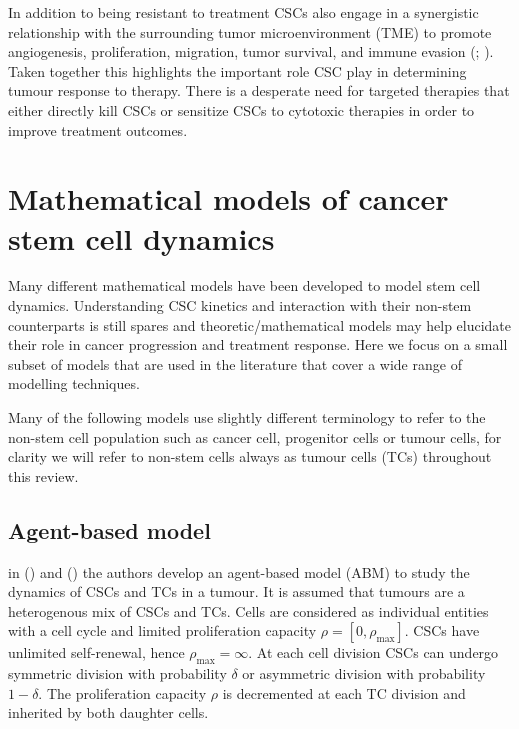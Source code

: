 \documentclass[
  letterpaper,
]{scrreprt}
\theoremstyle{definition}
\theoremstyle{remark}
\begin{document}
In addition to being resistant to treatment CSCs also engage in a
synergistic relationship with the surrounding tumor microenvironment
(TME) to promote angiogenesis, proliferation, migration, tumor survival,
and immune evasion (;
). Taken together this highlights the
important role CSC play in determining tumour response to therapy. There
is a desperate need for targeted therapies that either directly kill
CSCs or sensitize CSCs to cytotoxic therapies in order to improve
treatment outcomes.

\section{Mathematical models of cancer stem cell
dynamics}\label{sec-mathematical-models-of-cancer-stem-cell-dynamics}

Many different mathematical models have been developed to model stem
cell dynamics. Understanding CSC kinetics and interaction with their
non-stem counterparts is still spares and theoretic/mathematical models
may help elucidate their role in cancer progression and treatment
response. Here we focus on a small subset of models that are used in the
literature that cover a wide range of modelling techniques.

Many of the following models use slightly different terminology to refer
to the non-stem cell population such as cancer cell, progenitor cells or
tumour cells, for clarity we will refer to non-stem cells always as
tumour cells (TCs) throughout this review.

\subsection{Agent-based model}\label{sec-agent-based-model}

in () and
() the authors develop an
agent-based model (ABM) to study the dynamics of CSCs and TCs in a
tumour. It is assumed that tumours are a heterogenous mix of CSCs and
TCs. Cells are considered as individual entities with a cell cycle and
limited proliferation capacity \(\rho = [0,\rho_\text{max}]\). CSCs have
unlimited self-renewal, hence \(\rho_\text{max} = \infty\). At each cell
division CSCs can undergo symmetric division with probability \(\delta\)
or asymmetric division with probability \(1-\delta\). The proliferation
capacity \(\rho\) is decremented at each TC division and inherited by
both daughter cells.
\end{document}
